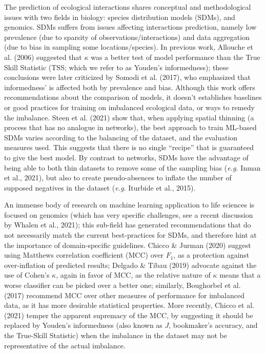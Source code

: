 \documentclass[10pt,oneside]{article}
\begin{document}
The prediction of ecological interactions shares conceptual and
methodological issues with two fields in biology: species distribution
models (SDMs), and genomics. SDMs suffers from issues affecting
interactions prediction, namely low prevalence (due to sparsity of
observations/interactions) and data aggregation (due to bias in sampling
some locations/species). In previous work, Allouche et al. (2006)
suggested that \(\kappa\) was a better test of model performance than
the True Skill Statistic (TSS; which we refer to as Youden's
informedness); these conclusions were later criticized by Somodi et al.
(2017), who emphasized that informedness' is affected both by prevalence
and bias. Although this work offers recommendations about the comparison
of models, it doesn't establishes baselines or good practices for
training on imbalanced ecological data, or ways to remedy the imbalance.
Steen et al. (2021) show that, when applying spatial thinning (a process
that has no analogue in networks), the best approach to train ML-based
SDMs varies according to the balancing of the dataset, and the
evaluation measures used. This suggests that there is no single
``recipe'' that is guaranteed to give the best model. By contrast to
networks, SDMs have the advantage of being able to both thin datasets to
remove some of the sampling bias (\emph{e.g.} Inman et al., 2021), but
also to create pseudo-absences to inflate the number of supposed
negatives in the dataset (\emph{e.g.} Iturbide et al., 2015).

An immense body of research on machine learning application to life
sciences is focused on genomics (which has very specific challenges, see
a recent discussion by Whalen et al., 2021); this sub-field has
generated recommendations that do not necessarily match the current
best-practices for SDMs, and therefore hint at the importance of
domain-specific guidelines. Chicco \& Jurman (2020) suggest using
Matthews correlation coefficient (MCC) over \(F_1\), as a protection
against over-inflation of predicted results; Delgado \& Tibau (2019)
advocate against the use of Cohen's \(\kappa\), again in favor of MCC,
as the relative nature of \(\kappa\) means that a worse classifier can
be picked over a better one; similarly, Boughorbel et al. (2017)
recommend MCC over other measures of performance for imbalanced data, as
it has more desirable statistical properties. More recently, Chicco et
al. (2021) temper the apparent supremacy of the MCC, by suggesting it
should be replaced by Youden's informedness (also known as \(J\),
bookmaker's accuracy, and the True-Skill Statistic) when the imbalance
in the dataset may not be representative of the actual imbalance.
\end{document}
